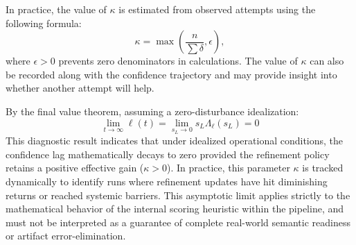 In practice, the value of \(\kappa\) is estimated from observed attempts using the following formula:
\begin{equation}
\kappa = \max\left(\frac{n}{\sum \delta},\epsilon\right),
\end{equation}
where \(\epsilon>0\) prevents zero denominators in calculations.
The value of \(\kappa\) can also be recorded along with the confidence trajectory and may provide insight into whether another attempt will help.

By the final value theorem, assuming a zero-disturbance idealization:
\begin{equation}
	\lim_{t\to\infty} \ell(t) = \lim_{s_L\to0} s_L \Lambda_{\ell}(s_L) = 0
\end{equation}
This diagnostic result indicates that under idealized operational conditions, the confidence lag mathematically decays to zero provided the refinement policy retains a positive effective gain ($\kappa > 0$). In practice, this parameter $\kappa$ is tracked dynamically to identify runs where refinement updates have hit diminishing returns or reached systemic barriers. This asymptotic limit applies strictly to the mathematical behavior of the internal scoring heuristic within the pipeline, and must not be interpreted as a guarantee of complete real-world semantic readiness or artifact error-elimination.

